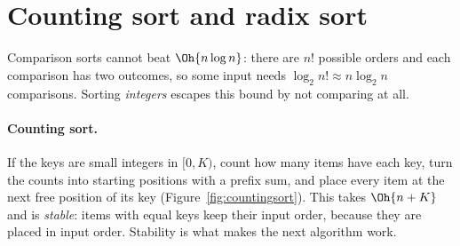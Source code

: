 
\section[Counting sort and radix sort]{Counting sort and radix sort \hfill \silver}\label{sec:radix}

Comparison sorts cannot beat $\Oh{n \log n}$: there are $n!$ possible orders and each comparison has two outcomes, so some
input needs $\log_2 n! \approx n \log_2 n$ comparisons. Sorting \emph{integers} escapes this bound by not comparing at all.

\paragraph{Counting sort.} If the keys are small integers in $[0, K)$, count how many items have each key, turn the counts
into starting positions with a prefix sum, and place every item at the next free position of its key
(Figure~\ref{fig:countingsort}). This takes $\Oh{n + K}$ and is \emph{stable}: items with equal keys keep their input order,
because they are placed in input order. Stability is what makes the next algorithm work.

